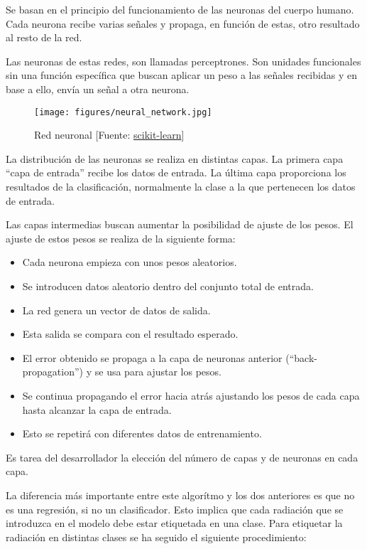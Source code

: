 	Se basan en el principio del funcionamiento de las neuronas del cuerpo humano. Cada neurona recibe varias señales y propaga, en función de estas, otro resultado al resto de la red.

	Las neuronas de estas redes, son llamadas perceptrones. Son unidades funcionales sin una función específica que buscan aplicar un peso a las señales recibidas y en base a ello, envía un señal a otra neurona.

	\begin{figure}[htb]
		\begin{center}
			\texttt{[image: figures/neural\_network.jpg]}
			\caption{Red neuronal [Fuente: \href{www.scikit-learn.org}{scikit-learn}] \label{network}}
		\end{center}
	\end{figure}

	La distribución de las neuronas se realiza en distintas capas. La primera capa ``capa de entrada'' recibe los datos de entrada. La última capa proporciona los resultados de la clasificación, normalmente la clase a la que pertenecen los datos de entrada.

	Las capas intermedias buscan aumentar la posibilidad de ajuste de los pesos. El ajuste de estos pesos se realiza de la siguiente forma:

	\begin{itemize}
		\item Cada neurona empieza con unos pesos aleatorios.
		\item Se introducen datos aleatorio dentro del conjunto total de entrada.
		\item La red genera un vector de datos de salida.
		\item Esta salida se compara con el resultado esperado.
		\item El error obtenido se propaga a la capa de neuronas anterior (``back-propagation'') y se usa para ajustar los pesos.
		\item Se continua propagando el error hacia atrás ajustando los pesos de cada capa hasta alcanzar la capa de entrada.
		\item Esto se repetirá con diferentes datos de entrenamiento.
 	\end{itemize}

	Es tarea del desarrollador la elección del número de capas y de neuronas en cada capa.

	La diferencia más importante entre este algorítmo y los dos anteriores es que no es una regresión, si no un clasificador. Esto implica que cada radiación que se introduzca en el modelo debe estar etiquetada en una clase. Para etiquetar la radiación en distintas clases se ha seguido el siguiente procedimiento:

